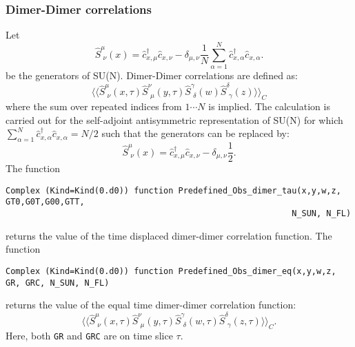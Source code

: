 

\subsubsection{Dimer-Dimer correlations }
Let  
\begin{equation}
	\hat{S}^{\mu}_{\, \,  \nu} (x)  =  \hat{c}^{\dagger}_{x,\mu} \hat{c}^{}_{x,\nu}    - \delta_{\mu,\nu} \frac{1}{N}  \sum_{\alpha = 1}^{N} \hat{c}^{\dagger}_{x,\alpha} \hat{c}^{}_{x,\alpha}.   
\end{equation}
be the generators of SU(N). 
Dimer-Dimer correlations are defined  as: 
\begin{equation}
 \langle \langle \hat{S}^{\mu}_{\, \,  \nu} (x,\tau)   \hat{S}^{\nu}_{\, \,  \mu} (y,\tau) 
              \hat{S}^{\gamma}_{\, \,  \delta} (w)   \hat{S}^{\delta}_{\, \,  \gamma} (z)   \rangle   \rangle_C  
\end{equation}
where the sum   over repeated indices   from $ 1 \cdots N $ is implied. 
The calculation is carried out  for the self-adjoint antisymmetric  representation of SU(N)   for which $ \sum_{\alpha = 1}^{N} \hat{c}^{\dagger}_{x,\alpha} \hat{c}^{}_{x,\alpha}  = N/2$   such that the generators can be replaced by: 
\begin{equation}
	\hat{S}^{\mu}_{\, \,  \nu} (x)  =  \hat{c}^{\dagger}_{x,\mu} \hat{c}^{}_{x,\nu}    - \delta_{\mu,\nu} \frac{1}{2}. 
\end{equation}
The  function 
\begin{lstlisting}[style=fortran]
Complex (Kind=Kind(0.d0)) function Predefined_Obs_dimer_tau(x,y,w,z, GT0,G0T,G00,GTT, 
                                                          N_SUN, N_FL)  
\end{lstlisting}
returns the   value of the time displaced   dimer-dimer correlation function. 
The  function 
\begin{lstlisting}[style=fortran]
Complex (Kind=Kind(0.d0)) function Predefined_Obs_dimer_eq(x,y,w,z, GR, GRC, N_SUN, N_FL)
\end{lstlisting}
returns the   value of the equal time  dimer-dimer correlation function:
\begin{equation}
 \langle \langle \hat{S}^{\mu}_{\, \,  \nu} (x,\tau)   \hat{S}^{\nu}_{\, \,  \mu} (y,\tau) 
              \hat{S}^{\gamma}_{\, \,  \delta} (w,\tau)   \hat{S}^{\delta}_{\, \,  \gamma} (z,\tau)   \rangle   \rangle_C.  
\end{equation}
Here,  both \texttt{GR}  and  \texttt{GRC}  are on time slice  $\tau$.

